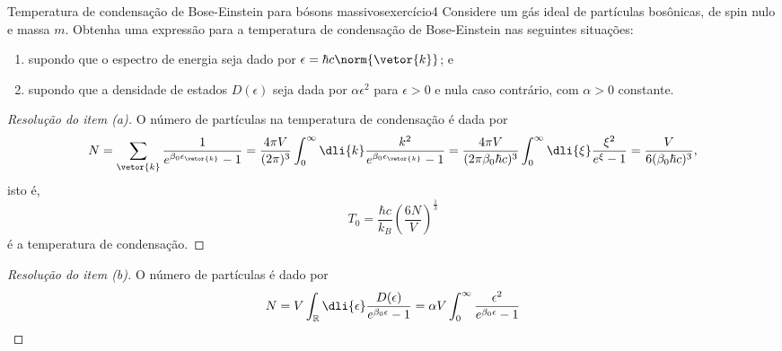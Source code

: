 \begin{exercício}{Temperatura de condensação de Bose-Einstein para bósons massivos}{exercício4}
    Considere um gás ideal de partículas bosônicas, de spin nulo e massa \(m\). Obtenha uma expressão para a temperatura de condensação de Bose-Einstein nas seguintes situações:
    \begin{enumerate}[label=(\alph*)]
        \item supondo que o espectro de energia seja dado por \(\epsilon = \hbar c \norm{\vetor{k}}\); e
        \item supondo que a densidade de estados \(D(\epsilon)\) seja dada por \(\alpha \epsilon^2\) para \(\epsilon > 0\) e nula caso contrário, com \(\alpha > 0\) constante.
    \end{enumerate}
\end{exercício}
\begin{proof}[Resolução do item (a)]
    O número de partículas na temperatura de condensação é dada por
    \begin{equation*}
        N = \sum_{\vetor{k}} \frac{1}{e^{\beta_0 \epsilon_{\vetor{k}}} - 1} = \frac{4\pi V}{(2\pi)^3} \int_0^\infty \dli{k} \frac{k^2}{e^{\beta_0 \epsilon_{\vetor{k}}} - 1} = \frac{4\pi V}{(2\pi \beta_0 \hbar c)^3} \int_0^\infty \dli{\xi} \frac{\xi^2}{e^{\xi} - 1} = \frac{V}{6(\beta_0 \hbar c)^3},
    \end{equation*}
    isto é,
    \begin{equation*}
        T_0 = \frac{\hbar c}{k_B}\left(\frac{6 N}{V}\right)^{\frac13}
    \end{equation*}
    é a temperatura de condensação.
\end{proof}
\begin{proof}[Resolução do item (b)]
    O número de partículas é dado por
    \begin{equation*}
        N = V\int_{\mathbb{R}} \dli{\epsilon} \frac{D(\epsilon)}{e^{\beta_0 \epsilon} - 1} = \alpha V \int_{0}^{\infty} \frac{\epsilon^2}{e^{\beta_0 \epsilon} - 1}
    \end{equation*}
\end{proof}

